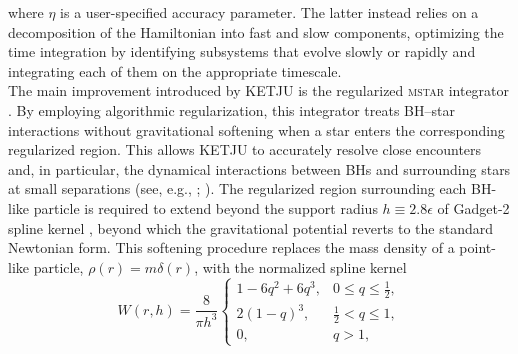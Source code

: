 \documentclass[12pt,twoside,openany]{book}
\begin{document}
where $\eta$ is a user-specified accuracy parameter. The latter instead relies on a decomposition of the Hamiltonian into fast and slow components, optimizing the time integration by identifying subsystems that evolve slowly or rapidly and integrating each of them on the appropriate timescale.\\The main improvement introduced by KETJU is the regularized \textsc{mstar} integrator \parencite{Rantala_2020}. By employing algorithmic regularization, this integrator treats BH--star interactions without gravitational softening when a star enters the corresponding regularized region. This allows KETJU to accurately resolve close encounters and, in particular, the dynamical interactions between BHs and surrounding stars at small separations (see, e.g., \citealt{Mikkola_1999a}; \citealt{Mikkola_1999b}). The regularized region surrounding each BH-like particle is required to extend beyond the support radius $h\equiv2.8\epsilon$ of Gadget-2 spline kernel \parencite{Springel_2005}, beyond which the gravitational potential reverts to the standard Newtonian form. This softening procedure replaces the mass density of a point-like particle, $\rho(r)=m\delta(r)$, with the normalized spline kernel
\begin{equation}
\label{softened mass distribution}
    W(r,h)=\frac{8}{\pi h^3}
    \begin{cases}
        1-6q^2+6q^3,
        & 0\leq q\leq \frac{1}{2},\\[6pt]
        2(1-q)^3,
        & \frac{1}{2}<q\leq 1,\\[6pt]
        0,
        & q>1,
    \end{cases}
\end{equation}
\end{document}
